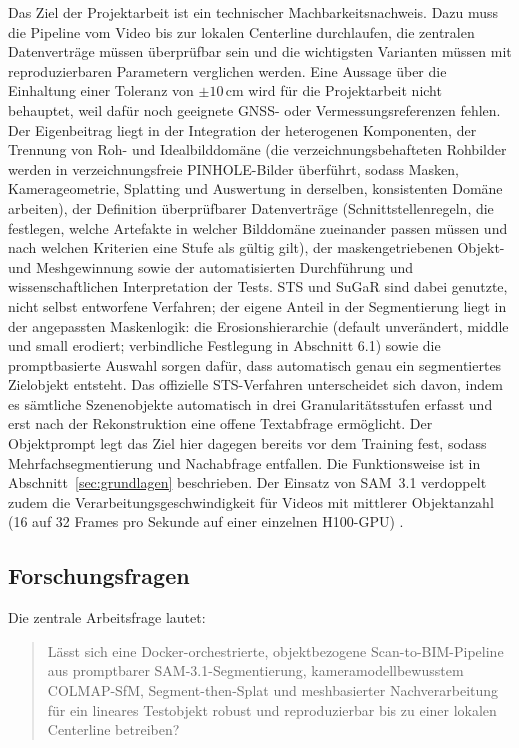 Das Ziel der Projektarbeit ist ein technischer Machbarkeitsnachweis. Dazu muss
die Pipeline vom Video bis zur lokalen Centerline durchlaufen, die zentralen
Datenverträge müssen überprüfbar sein und die wichtigsten Varianten müssen mit
reproduzierbaren Parametern verglichen werden. Eine Aussage über die Einhaltung
einer Toleranz von \(\pm 10\,\mathrm{cm}\) wird für die Projektarbeit nicht
behauptet, weil dafür noch geeignete GNSS- oder Vermessungsreferenzen fehlen.
Der Eigenbeitrag liegt in der Integration der heterogenen Komponenten, der
Trennung von Roh- und Idealbilddomäne (die verzeichnungsbehafteten Rohbilder
werden in verzeichnungsfreie PINHOLE-Bilder überführt, sodass Masken,
Kamerageometrie, Splatting und Auswertung in derselben, konsistenten Domäne
arbeiten), der Definition überprüfbarer Datenverträge (Schnittstellenregeln,
die festlegen, welche Artefakte in welcher Bilddomäne zueinander passen
müssen und nach welchen Kriterien eine Stufe als gültig gilt), der
maskengetriebenen Objekt- und Meshgewinnung sowie der automatisierten
Durchführung und wissenschaftlichen Interpretation der Tests. STS und SuGaR
sind dabei genutzte, nicht selbst entworfene Verfahren; der eigene Anteil in
der Segmentierung liegt in der angepassten Maskenlogik: die Erosionshierarchie
(default unverändert, middle und small erodiert; verbindliche Festlegung in Abschnitt 6.1) sowie die promptbasierte
Auswahl sorgen dafür, dass automatisch genau ein
segmentiertes Zielobjekt entsteht. Das offizielle STS-Verfahren unterscheidet
sich davon, indem es sämtliche Szenenobjekte automatisch in drei
Granularitätsstufen erfasst und erst nach der Rekonstruktion eine offene
Textabfrage ermöglicht. Der Objektprompt legt das Ziel hier dagegen bereits
vor dem Training fest, sodass Mehrfachsegmentierung und Nachabfrage
entfallen. Die Funktionsweise ist in
Abschnitt~\ref{sec:grundlagen} beschrieben.
Der Einsatz von SAM~3.1 verdoppelt zudem die Verarbeitungsgeschwindigkeit für
Videos mit mittlerer Objektanzahl (16 auf 32 Frames pro Sekunde auf einer
einzelnen H100-GPU) \parencite{metaSam3}.

\subsection{Forschungsfragen}

Die zentrale Arbeitsfrage lautet:
\begin{quote}
Lässt sich eine Docker-orchestrierte, objektbezogene Scan-to-BIM-Pipeline aus
promptbarer SAM-3.1-Segmentierung, kameramodellbewusstem COLMAP-SfM,
Segment-then-Splat und meshbasierter Nachverarbeitung für ein lineares
Testobjekt robust und reproduzierbar bis zu einer lokalen Centerline betreiben?
\end{quote}

